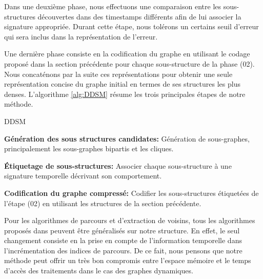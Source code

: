 			 Dans une deuxième phase, nous effectuons une comparaison entre les sous-structures découvertes dans des timestamps différents afin de lui associer la signature appropriée. Durant cette étape, nous tolérons un certains seuil d'erreur qui sera inclus dans la représentation de l'erreur.
			 
			 Une dernière phase consiste en la codification du graphe en utilisant le codage proposé dans la section précédente pour chaque sous-structure de la phase (02). Nous concaténons par la suite ces représentations pour obtenir une seule représentation concise du graphe initial en termes de ses structures les plus denses. 
			L'algorithme \ref{alg:DDSM} résume les trois principales étapes de notre méthode.
			\begin{algorithm}
					\label{alg:DDSM}
					\caption{DDSM}
					\label{Pseudo Algorithme de la méthode proposée (DDSM)}
				\begin{algorithmic} [1]
					\STATE \textbf{Génération des sous structures candidates: }Génération de sous-graphes, principalement les sous-graphes bipartis et les cliques.
					
					\STATE  \textbf{Étiquetage de sous-structures: }Associer chaque sous-structure à une signature temporelle décrivant son comportement.
					
					\STATE \textbf{Codification du graphe compressé: }Codifier les sous-structures étiquetées de l'étape (02) en utilisant les structures de la section précédente.
				\end{algorithmic}
			\end{algorithm}
			
			Pour les algorithmes de parcours et d'extraction de voisins, tous les algorithmes proposés dans \citep{hernandez2014compressed} peuvent être généralisés sur notre structure. En effet, le seul changement consiste en la  prise en compte de l'information temporelle dans l'incrémentation des indices de parcours. De ce fait, nous pensons que notre méthode peut offrir un très bon compromis entre l'espace mémoire et le temps d'accès des traitements dans le cas des graphes dynamiques. 
			

	